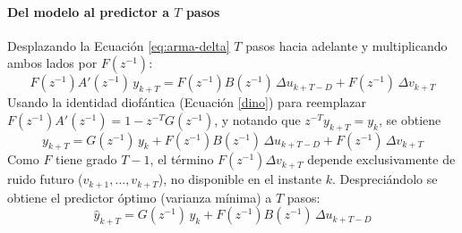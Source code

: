 \paragraph{Del modelo al predictor a $T$ pasos}
Desplazando la Ecuación \ref{eq:arma-delta} $T$ pasos hacia adelante y multiplicando ambos lados por $F(z^{-1})$:
\[
  F(z^{-1})A'(z^{-1})\,y_{k+T} = F(z^{-1})B(z^{-1})\,\Delta u_{k+T-D} + F(z^{-1})\,\Delta v_{k+T}
\]
Usando la identidad diofántica (Ecuación \ref{dino}) para reemplazar $F(z^{-1})A'(z^{-1}) = 1 - z^{-T}G(z^{-1})$, y notando que $z^{-T}y_{k+T} = y_k$, se obtiene
\begin{equation}
  y_{k+T} = G(z^{-1})\,y_k + F(z^{-1})B(z^{-1})\,\Delta u_{k+T-D} + F(z^{-1})\,\Delta v_{k+T}
  \label{eq:predictor}
\end{equation}
Como $F$ tiene grado $T-1$, el término $F(z^{-1})\Delta v_{k+T}$ depende exclusivamente de ruido futuro ($v_{k+1}, \ldots, v_{k+T}$), no disponible en el instante $k$. Despreciándolo se obtiene el predictor óptimo (varianza mínima) a $T$ pasos:
\begin{equation}
  \hat{y}_{k+T} = G(z^{-1})\,y_k + F(z^{-1})B(z^{-1})\,\Delta u_{k+T-D}
  \label{eq:predictor-opt}
\end{equation}

